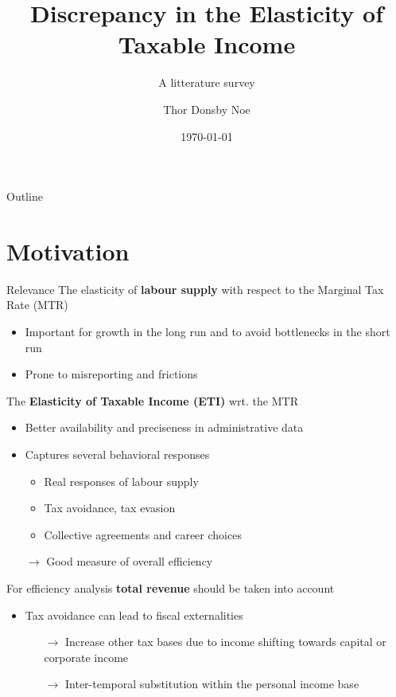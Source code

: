 \documentclass[8pt]{beamer}
\title{Discrepancy in the Elasticity of Taxable Income}
\subtitle{A litterature survey}
\date{\today}
\author{Thor Donsby Noe}
\institute{Public Economics II: Theory of Taxation \\
          w. Javier Vázquez-Grenno}
\begin{document}
\maketitle


\begin{frame}{Outline}
  \tableofcontents
\end{frame}


\section{Motivation}


\begin{frame}{Relevance}
  The elasticity of \textbf{labour supply} with respect to the Marginal Tax Rate (MTR)
  \begin{itemize}
    \item Important for growth in the long run and to avoid bottlenecks in the short run
    \item Prone to misreporting and frictions
  \end{itemize}
  The \textbf{Elasticity of Taxable Income (ETI)} wrt. the MTR
  \begin{itemize}
    \item Better availability and preciseness in administrative data
    \item Captures several behavioral responses
    \begin{itemize}
      \item Real responses of labour supply
      \item Tax avoidance, tax evasion
      \item Collective agreements and career choices
    \end{itemize}
    \item[$\rightarrow$] Good measure of overall efficiency
  \end{itemize}
  For efficiency analysis \textbf{total revenue} should be taken into account
  \begin{itemize}
    \item Tax avoidance can lead to fiscal externalities
    \begin{itemize}
      \item[$\rightarrow$] Increase other tax bases due to income shifting towards capital or corporate income
      \item[$\rightarrow$] Inter-temporal substitution within the personal income base
    \end{itemize}
  \end{itemize}
\end{frame}
\end{document}
